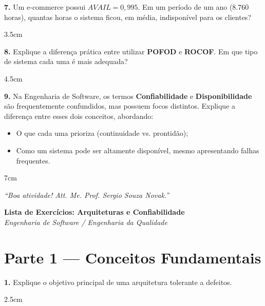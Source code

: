 \documentclass[12pt,a4paper,twoside]{report}
\begin{document}
\vspace{0.5cm}

\textbf{7.} Um e-commerce possui $AVAIL = 0,995$. Em um período de um ano (8.760 horas), quantas horas o sistema ficou, em média, indisponível para os clientes?
\begin{resposta}{3.5cm}
\end{resposta}

\vspace{0.5cm}

\textbf{8.} Explique a diferença prática entre utilizar \textbf{POFOD} e \textbf{ROCOF}. Em que tipo de sistema cada uma é mais adequada?
\begin{resposta}{4.5cm}
\end{resposta}

\vspace{0.8cm}
\vspace{0.5cm}

\textbf{9.} Na Engenharia de Software, os termos \textbf{Confiabilidade} e \textbf{Disponibilidade} são frequentemente confundidos, mas possuem focos distintos. Explique a diferença entre esses dois conceitos, abordando:
\begin{itemize}
    \item O que cada uma prioriza (continuidade vs. prontidão);
    \item Como um sistema pode ser altamente disponível, mesmo apresentando falhas frequentes.
\end{itemize}

\begin{resposta}{7cm}
\end{resposta}
\begin{center}
    \textit{“Boa atividade! Att. Me. Prof. Sergio Souza Novak.”}
\end{center}

\begin{center}
  {\Large \textbf{Lista de Exercícios: Arquiteturas e Confiabilidade}}\\[0.2cm]
  \textit{Engenharia de Software / Engenharia da Qualidade}
\end{center}

\vspace{0.4cm}

\section*{Parte 1 — Conceitos Fundamentais}

\textbf{1.} Explique o objetivo principal de uma arquitetura tolerante a defeitos.
\begin{resposta}{2.5cm}
\end{resposta}
\end{document}
